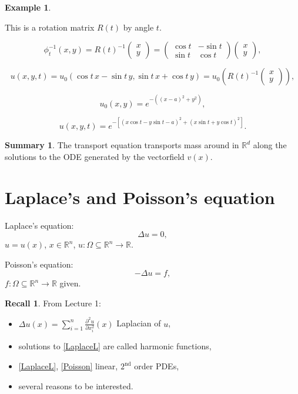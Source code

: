 \documentclass[12pt]{article}
\theoremstyle{definition}
\newtheorem*{recall}{Recall}
\newtheorem*{summary}{Summary}
\newtheorem*{example*}{Example}
\begin{document}
\begin{example*}
\begin{enumerate}[label=\arabic*)]
This is a rotation matrix $R(t)$ by angle $t$.

\[\phi_t^{-1}(x,y)=R(t)^{-1}\left(\begin{matrix}x\\y\end{matrix}\right)=\left(\begin{matrix}\cos t&-\sin t\\\sin t&\cos t\end{matrix}\right)\left(\begin{matrix}x\\y\end{matrix}\right),\]

\[u(x,y,t)=u_0(\cos t\,x-\sin t\,y,\sin t\,x+\cos t\,y)=u_0\left(R(t)^{-1}\left(\begin{matrix}x\\y\end{matrix}\right)\right),\]

\[u_0(x,y)=e^{-((x-a)^2+y^2)},\]

\[u(x,y,t)=e^{-[(x\cos t-y\sin t-a)^2+(x\sin t+y\cos t)^2]}.\]
\end{enumerate}
\end{example*}

\begin{summary}
The transport equation transports mass around in $\mathbb R^d$ along the solutions to the ODE generated by the vectorfield $v(x)$.
\end{summary}

\renewcommand{\theHsection}{section.\thesection}
\section{Laplace's and Poisson's equation}\label{Laplace_Poisson}
Laplace's equation:
\begin{equation}\tag{L}\label{LaplaceL}
\Delta u=0,
\end{equation}
$u=u(x)$, $x\in\mathbb R^n$, $u:\Omega\subseteq\mathbb R^n\rightarrow\mathbb R$.

Poisson's equation:
\begin{equation}\tag{P}\label{Poisson}
-\Delta u=f,
\end{equation}
$f:\Omega\subseteq\mathbb R^n\rightarrow\mathbb R$ given.

\begin{recall}
From Lecture 1:
\begin{itemize}
\item $\displaystyle{\Delta u(x)=\sum_{i=1}^n\frac{\partial^2u}{\partial x_i^2}(x)}$ Laplacian of $u$,
\item solutions to \eqref{LaplaceL} are called harmonic functions,
\item \eqref{LaplaceL}, \eqref{Poisson} linear, $2^\text{nd}$ order PDEs,
\item several reasons to be interested.
\end{itemize}
\end{recall}
\end{document}
